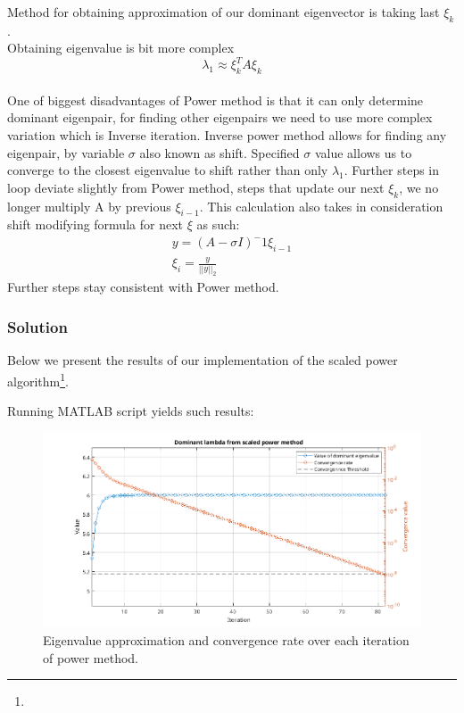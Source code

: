 Method for obtaining approximation of our dominant eigenvector is taking last $\xi_k$.\\
Obtaining eigenvalue is bit more complex
\begin{equation*}
    \lambda_1 \approx \xi_k^T A \xi_k 
\end{equation*}
\\
One of biggest disadvantages of Power method is that it can only determine dominant eigenpair, for finding other eigenpairs we need to use more complex variation which is Inverse iteration.
Inverse power method allows for finding any eigenpair, by variable $\sigma$ also known as shift\cite{Demmel}.
Specified $\sigma$ value allows us to converge to the closest eigenvalue to shift rather than only $\lambda_1$. Further steps in loop deviate slightly from Power method, steps that update our next $\xi_k$, we no longer multiply A by previous $\xi_{i-1}$. This calculation also takes in consideration shift modifying formula for next $\xi$ as such:
\begin{equation*}
    \begin{matrix}
        y = (A - \sigma I)^-1 \xi_{i-1}\\
        \xi_i = \frac{y}{||y||_2}
    \end{matrix}
\end{equation*}
Further steps stay consistent with Power method.
\subsubsection*{Solution}
Below we present the results of our \MATLAB{} implementation of the scaled power
algorithm\footnote{}.

Running MATLAB script yields such results:


\begin{figure}[H]
    \centering
    \includegraphics[width=1\textwidth]{problems/Figures/Problem2ScaledPowerMethod.png}
    \caption{Eigenvalue approximation and convergence rate over each iteration of power method.}
    \label{fig:Power}
\end{figure}


